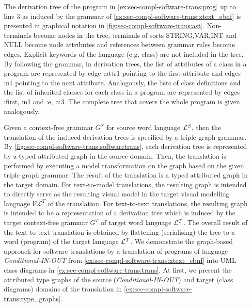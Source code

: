 \begin{example}
\label{ex:sec-compl-software-trans:der_tree1}
The derivation tree of the program in \cref{ex:sec-compl-software-trans:prog} up to line 3 as induced by the grammar of \cref{ex:sec-compl-software-trans:xtext_ebnf} is presented in graphical notation in \cref{fig:sec-compl-software-trans:ast}.
Non-terminals become nodes in the tree, terminals of sorts \textsf{STRING},\textsf{VAR},\textsf{INT} and \textsf{NULL} become node attributes and references between grammar rules become edges.
Explicit keywords of the language (e.g. \textsf{class}) are not included in the tree.
By following the grammar, in derivation trees, the list of attributes of a class in a program are represented by edge \textsf{:attr1} pointing to the first attribute and edges \textsf{:n4} pointing to the next attribute.
Analogously, the lists of class definitions and the list of inherited classes for each class in a program are represented by edges \textsf{:first}, \textsf{:n1} and \textsf{:e}, \textsf{:n3}.
The complete tree that covers the whole program is given analogously.
\envEndMarker
\end{example}

Given a context-free grammar $G^S$ for source word language $\mathcal{L}^S$, then the translation of the induced derivation trees is specified by a triple graph grammar.
By \cref{fig:sec-compl-software-trans:softwaretrans}, each derivation tree is represented by a typed attributed graph in the source domain.
Then, the translation is performed by executing a model transformation on the graph based on the given triple graph grammar.
The result of the translation is a typed attributed graph in the target domain.
For text-to-model translations, the resulting graph is intended to directly serve as the resulting visual model in the target visual modelling language $\mathcal{VL}^T$ of the translation.
For text-to-text translations, the resulting graph is intended to be a representation of a derivation tree which is induced by the target context-free grammar $G^T$ of target word language $\mathcal{L}^T$.
The overall result of the text-to-text translation is obtained by flattening (serialising) the tree to a word (program) of the target language $\mathcal{L}^T$.
We demonstrate the graph-based approach for software translations by a translation of programs of language \textit{Conditional-IN-OUT} from \cref{ex:sec-compl-software-trans:xtext_ebnf} into UML class diagrams in \cref{ex:sec-compl-software-trans:trans}.
At first, we present the attributed type graphs of the source (\textit{Conditional-IN-OUT}) and target (class diagrams) domains of the translation in \cref{ex:sec-compl-software-trans:type_graphs}.

